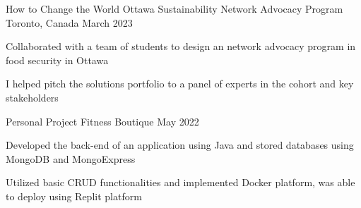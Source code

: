 \begin{cventries}
  \cventry
    {How to Change the World}
    {Ottawa Sustainability Network Advocacy Program}
    {Toronto, Canada}
    {March 2023}
    {
      \begin{cvitems}
        \item {Collaborated with a team of students to design an network advocacy program in food security in Ottawa
        \item I helped pitch the solutions portfolio to a panel of experts in the cohort and key stakeholders}      
        \end{cvitems}
    }
  \cventry
    {Personal Project}
    {Fitness Boutique}
    {}
    {May 2022}
    {
      \begin{cvitems}
        \item {Developed the back-end of an application using Java and stored databases using MongoDB and MongoExpress
        \item Utilized basic CRUD functionalities and implemented Docker platform, was able to deploy using Replit platform}      
        \end{cvitems}
    }
\end{cventries}
